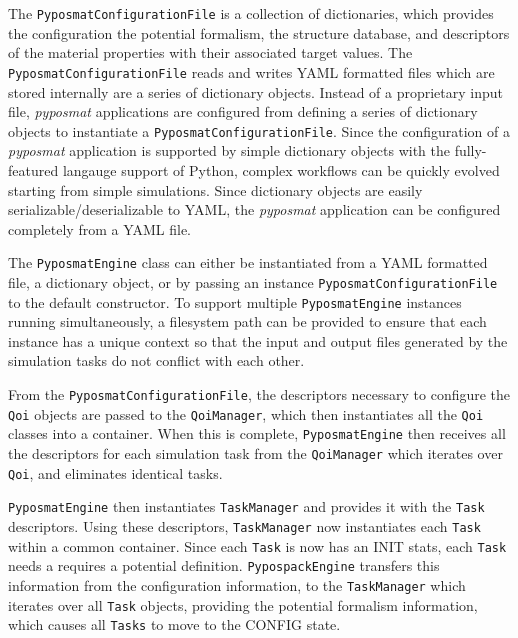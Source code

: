 The \verb|PyposmatConfigurationFile| is a collection of dictionaries, which provides the configuration the potential formalism, the structure database, and descriptors of the material properties with their associated target values.
The \verb|PyposmatConfigurationFile| reads and writes YAML formatted files which are stored internally are a series of dictionary objects.
Instead of a proprietary input file, \emph{pyposmat} applications are configured from defining a series of dictionary objects to instantiate a \verb|PyposmatConfigurationFile|.
Since the configuration of a \emph{pyposmat} application is supported by simple dictionary objects with the fully-featured langauge support of Python, complex workflows can be quickly evolved starting from simple simulations.
Since dictionary objects are easily serializable/deserializable to YAML, the \emph{pyposmat} application can be configured completely from a YAML file.

The \verb|PyposmatEngine| class can either be instantiated from a YAML formatted file, a dictionary object, or by passing an instance \verb|PyposmatConfigurationFile| to the default constructor.  To support multiple \verb|PyposmatEngine| instances running simultaneously, a filesystem path can be provided to ensure that each instance has a unique context so that the input and output files generated by the simulation tasks do not conflict with each other.

From the \verb|PyposmatConfigurationFile|, the descriptors necessary to configure the \verb|Qoi| objects are passed to the \verb|QoiManager|, which then instantiates all the \verb|Qoi| classes into a container.  When this is complete, \verb|PyposmatEngine| then receives all the descriptors for each simulation task from the \verb|QoiManager| which iterates over \verb|Qoi|, and eliminates identical tasks.

\verb|PyposmatEngine| then instantiates \verb|TaskManager| and provides it with the \verb|Task| descriptors.  Using these descriptors, \verb|TaskManager| now instantiates each \verb|Task| within a common container.  Since each \verb|Task| is now has an INIT stats, each \verb|Task| needs a requires a potential definition.  \verb|PypospackEngine| transfers this information from the configuration information, to the \verb|TaskManager| which iterates over all \verb|Task| objects, providing the potential formalism information, which causes all \verb|Tasks| to move to the CONFIG state.

